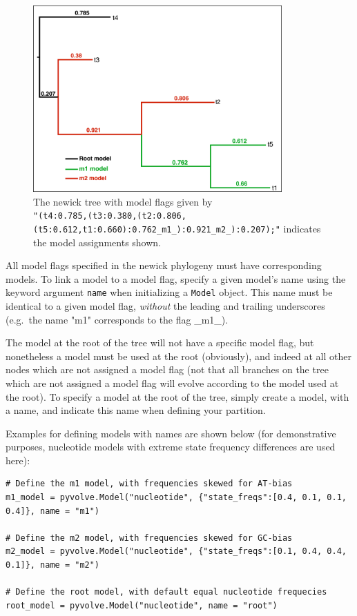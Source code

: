 \documentclass{article}
\newcommand{\code}[1]{\texttt{\small{#1}}}
\begin{document}
\begin{figure}[htpb]%
	\includegraphics[width=3.75in]{treeflags_colors.pdf}
	\caption{\label{fig:treeflags} The newick tree with model flags given by \\ \texttt{\scriptsize{"(t4:0.785,(t3:0.380,(t2:0.806,(t5:0.612,t1:0.660):0.762\_m1\_):0.921\_m2\_):0.207);"}}
		indicates the model assignments shown.}
\end{figure}


All model flags specified in the newick phylogeny must have corresponding models. To link a model to a model flag, specify a given model's name using the keyword argument \code{name} when initializing a \code{Model} object. This name must be identical to a given model flag, \emph{without} the leading and trailing underscores (e.g.\ the name "m1" corresponds to the flag \_m1\_).

The model at the root of the tree will not have a specific model flag, but nonetheless a model must be used at the root (obviously), and indeed at all other nodes which are not assigned a model flag (not that all branches on the tree which are not assigned a model flag will evolve according to the model used at the root). To specify a model at the root of the tree, simply create a model, with a name, and indicate this name when defining your partition.

Examples for defining models with names are shown below (for demonstrative purposes, nucleotide models with extreme state frequency differences are used here):
\begin{lstlisting}
# Define the m1 model, with frequencies skewed for AT-bias
m1_model = pyvolve.Model("nucleotide", {"state_freqs":[0.4, 0.1, 0.1, 0.4]}, name = "m1")

# Define the m2 model, with frequencies skewed for GC-bias
m2_model = pyvolve.Model("nucleotide", {"state_freqs":[0.1, 0.4, 0.4, 0.1]}, name = "m2")

# Define the root model, with default equal nucleotide frequecies
root_model = pyvolve.Model("nucleotide", name = "root")
\end{lstlisting}
\end{document}
